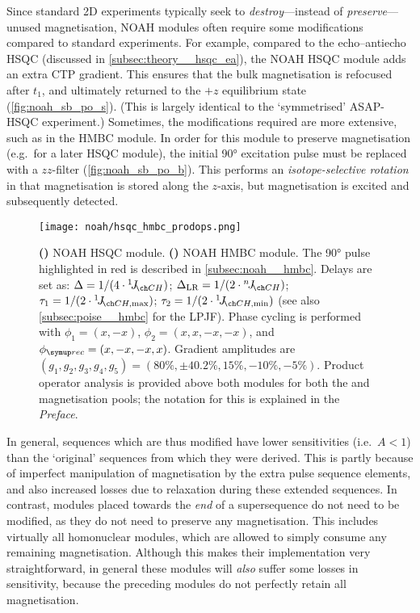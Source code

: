 Since standard 2D experiments typically seek to \textit{destroy}---instead of \textit{preserve}---unused magnetisation, NOAH modules often require some modifications compared to standard experiments.
For example, compared to the echo--antiecho HSQC (discussed in \cref{subsec:theory__hsqc_ea}), the NOAH HSQC module\autocite{Kupce2017ACIE} adds an extra CTP gradient.
This ensures that the bulk magnetisation is refocused after $t_1$, and ultimately returned to the $+z$ equilibrium state (\cref{fig:noah_sb_po_s}).
(This is largely identical to the `symmetrised' ASAP-HSQC experiment\autocite{SchulzeSunninghausen2017JMR}.)
Sometimes, the modifications required are more extensive, such as in the HMBC module.
In order for this module to preserve  magnetisation (e.g.\ for a later HSQC module), the initial \ang{90} excitation pulse must be replaced with a $zz$-filter (\cref{fig:noah_sb_po_b}).
This performs an \textit{isotope-selective rotation} in that  magnetisation is stored along the $z$-axis, but  magnetisation is excited and subsequently detected.

\begin{figure}[htb]
    \centering
    \texttt{[image: noah/hsqc\_hmbc\_prodops.png]}%
    {\label{fig:noah_sb_po_s}}%
    {\label{fig:noah_sb_po_b}}%
    \caption[NOAH HSQC and HMBC modules with product operator analysis]{
        \textbf{()} 
        NOAH HSQC module.
        \textbf{()} 
        NOAH HMBC module.
        The \ang{90} pulse highlighted in red is described in \cref{subsec:noah__hmbc}.
        Delays are set as: $\Delta = 1 / (4 \cdot \oneJ{CH})$; $\Delta_\text{LR} = 1 / (2 \cdot \nJ{CH})$; $\tau_1 = 1 / (2 \cdot \oneJ{CH,\text{max}})$; $\tau_2 = 1 / (2 \cdot \oneJ{CH,\text{min}})$ (see also \cref{subsec:poise__hmbc} for the LPJF).
        Phase cycling is performed with $\phi_1 = (x, -x)$, $\phi_2 = (x, x, -x, -x)$, and $\phirec = (x, -x, -x, x)$.
        Gradient amplitudes are $(g_1, g_2, g_3, g_4, g_5) = (80\%, \pm 40.2\%, 15\%, -10\%, -5\%)$.
        Product operator analysis is provided above both modules for both the  and  magnetisation pools; the notation for this is explained in the \textit{Preface}.
    }
    \label{fig:noah_sb_po}
\end{figure}

In general, sequences which are thus modified have lower sensitivities (i.e.\ $A < 1$) than the `original' sequences from which they were derived.
This is partly because of imperfect manipulation of magnetisation by the extra pulse sequence elements, and also increased losses due to relaxation during these extended sequences.
In contrast, modules placed towards the \textit{end} of a supersequence do not need to be modified, as they do not need to preserve any magnetisation.
This includes virtually all homonuclear modules, which are allowed to simply consume any remaining magnetisation.
Although this makes their implementation very straightforward, in general these modules will \textit{also} suffer some losses in sensitivity, because the preceding modules do not perfectly retain all magnetisation.

